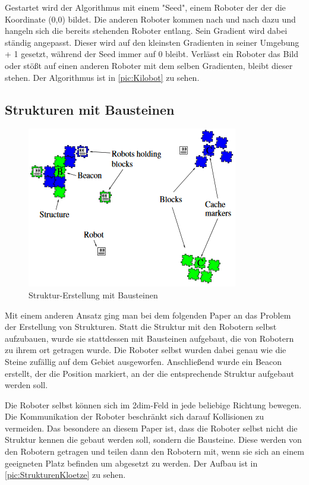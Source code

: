 Gestartet wird der Algorithmus mit einem "Seed", einem Roboter der der die Koordinate (0,0) bildet. Die anderen Roboter kommen nach und nach dazu und hangeln sich die bereits stehenden Roboter entlang. Sein Gradient wird dabei ständig angepasst. Dieser wird auf den kleinsten Gradienten in seiner Umgebung + 1 gesetzt, während der Seed immer auf 0 bleibt.
Verlässt ein Roboter das Bild oder stößt auf einen anderen Roboter mit dem selben Gradienten, bleibt dieser stehen.\cite{Kilobot} Der Algorithmus ist in \autoref{pic:Kilobot} zu sehen.

\subsection*{Strukturen mit Bausteinen}

\begin{figure}
	\includegraphics[width=\pictureWidthBig,keepaspectratio]{graphics/StrukturenKloetze.png}
	\caption{Struktur-Erstellung mit Bausteinen}
	\label{pic:StrukturenKloetze}
\end{figure}

Mit einem anderen Ansatz ging man bei dem folgenden Paper an das Problem der Erstellung von Strukturen. Statt die Struktur mit den Robotern selbst aufzubauen, wurde sie stattdessen mit Bausteinen aufgebaut, die von Robotern zu ihrem ort getragen wurde. Die Roboter selbst wurden dabei genau wie die Steine zufällig auf dem Gebiet ausgeworfen. Anschließend wurde ein Beacon erstellt, der die Position markiert, an der die entsprechende Struktur aufgebaut werden soll.

Die Roboter selbst können sich im 2dim-Feld in jede beliebige Richtung bewegen. Die Kommunikation der Roboter beschränkt sich darauf Kollisionen zu vermeiden. Das besondere an diesem Paper ist, dass die Roboter selbst nicht die Struktur kennen die gebaut werden soll, sondern die Bausteine. Diese werden von den Robotern getragen und teilen dann den Robotern mit, wenn sie sich an einem geeigneten Platz befinden um abgesetzt zu werden.\cite{RobotPatterns}
Der Aufbau ist in \autoref{pic:StrukturenKloetze} zu sehen.

